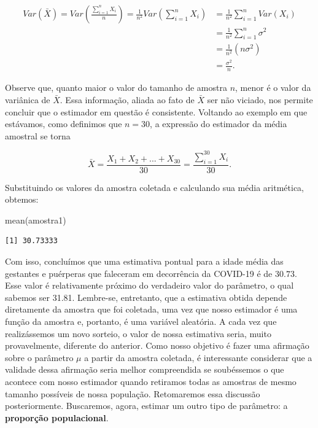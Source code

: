 \documentclass[
  letterpaper,
  DIV=11,
  numbers=noendperiod]{scrreprt}
\newenvironment{Shaded}{\begin{snugshade}}{\end{snugshade}}
\newcommand{\FunctionTok}[1]{\textcolor[rgb]{0.28,0.35,0.67}{#1}}
\newcommand{\NormalTok}[1]{\textcolor[rgb]{0.00,0.23,0.31}{#1}}
\begin{document}
\[
\begin{align}
Var(\bar{X}) = Var\left(\frac{\sum_{i = 1}^{n} X_i}{n}\right) = \frac{1}{n^2} Var\left(\sum_{i = 1}^{n} X_i\right) & = \frac{1}{n^2} \sum_{i = 1}^{n} Var(X_i) \\ & = \frac{1}{n^2} \sum_{i = 1}^{n} \sigma^2 \\ & = \frac{1}{n^2} (n \sigma^2) \\ & = \frac{\sigma^2}{n}.
\end{align}
\]

Observe que, quanto maior o valor do tamanho de amostra \(n\), menor é o
valor da variânica de \(\bar{X}\). Essa informação, aliada ao fato de
\(\bar{X}\) ser não viciado, nos permite concluir que o estimador em
questão é consistente. Voltando ao exemplo em que estávamos, como
definimos que \(n = 30\), a expressão do estimador da média amostral se
torna

\[
\bar{X} = \frac{X_1 + X_2 + ... + X_{30}}{30} = \frac{\sum_{i = 1}^{30} X_i}{30}.
\]

Substituindo os valores da amostra coletada e calculando sua média
aritmética, obtemos:

\begin{Shaded}
\begin{Highlighting}[]
\FunctionTok{mean}\NormalTok{(amostra1)}
\end{Highlighting}
\end{Shaded}

\begin{verbatim}
[1] 30.73333
\end{verbatim}

Com isso, concluímos que uma estimativa pontual para a idade média das
gestantes e puérperas que faleceram em decorrência da COVID-19 é de
\(30.73\). Esse valor é relativamente próximo do verdadeiro valor do
parâmetro, o qual sabemos ser 31.81. Lembre-se, entretanto, que a
estimativa obtida depende diretamente da amostra que foi coletada, uma
vez que nosso estimador é uma função da amostra e, portanto, é uma
variável aleatória. A cada vez que realizássemos um novo sorteio, o
valor de nossa estimativa seria, muito provavelmente, diferente do
anterior. Como nosso objetivo é fazer uma afirmação sobre o parâmetro
\(\mu\) a partir da amostra coletada, é interessante considerar que a
validade dessa afirmação seria melhor compreendida se soubéssemos o que
acontece com nosso estimador quando retiramos todas as amostras de mesmo
tamanho possíveis de nossa população. Retomaremos essa discussão
posteriormente. Buscaremos, agora, estimar um outro tipo de parâmetro: a
\textbf{proporção populacional}.
\end{document}
